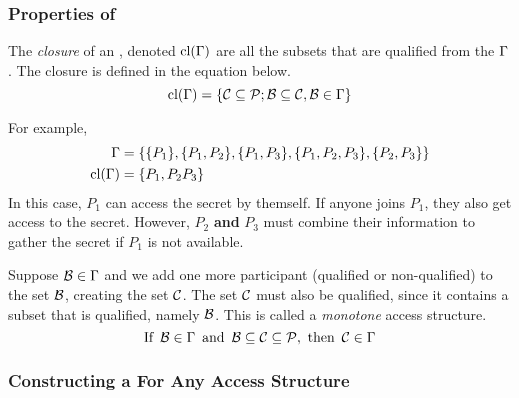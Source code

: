 \subsubsection{Properties of }\label{subsubsec:Properties_Access_Structures}
\begin{definition}[Closure]\label{def:Closure_Access_Structure}
  The \emph{closure} of an , denoted $\operatorname{\text{cl}}(\operatorname{\Gamma})$ are all the subsets that are qualified from the  $\operatorname{\Gamma}$.
  The closure is defined in the equation below.
  \begin{equation}\label{eq:Closure_Access_Structure}
    \operatorname{\text{cl}}(\operatorname{\Gamma}) = \lbrace \operatorname{\mathcal{C}} \subseteq \operatorname{\mathcal{P}}; \operatorname{\mathcal{B}} \subseteq \operatorname{\mathcal{C}}, \operatorname{\mathcal{B}} \in \operatorname{\Gamma} \rbrace
  \end{equation}

  For example,
  \begin{align*}
    \operatorname{\Gamma} &= \lbrace \lbrace P_{1} \rbrace, \lbrace P_{1}, P_{2} \rbrace, \lbrace P_{1}, P_{3} \rbrace, \lbrace P_{1}, P_{2}, P_{3} \rbrace, \lbrace P_{2}, P_{3} \rbrace \rbrace \\
    \operatorname{\text{cl}}(\operatorname{\Gamma}) &= \lbrace P_{1}, P_{2}P_{3} \rbrace
  \end{align*}
  In this case, $P_{1}$ can access the secret by themself.
  If anyone joins $P_{1}$, they also get access to the secret.
  However, $P_{2}$ \textbf{and} $P_{3}$ must combine their information to gather the secret if $P_{1}$ is not available.
\end{definition}

\begin{definition}[Monotone]\label{def:Monotone_Access_Structure}
  Suppose $\operatorname{\mathcal{B}} \in \operatorname{\Gamma}$ and we add one more participant (qualified or non-qualified) to the set $\operatorname{\mathcal{B}}$, creating the set $\operatorname{\mathcal{C}}$.
  The set $\operatorname{\mathcal{C}}$ must also be qualified, since it contains a subset that is qualified, namely $\operatorname{\mathcal{B}}$.
  This  is called a \emph{monotone} access structure.
  \begin{equation}\label{eq:Monotone_Access_Structure}
    \text{If } \operatorname{\mathcal{B}} \in \operatorname{\Gamma} \text{ and } \operatorname{\mathcal{B}} \subseteq \operatorname{\mathcal{C}} \subseteq \operatorname{\mathcal{P}}, \text{ then } \operatorname{\mathcal{C}} \in \operatorname{\Gamma}
  \end{equation}

\end{definition}

\subsubsection{Constructing a  For Any Access Structure}\label{subsubsec:Construct_Perfect_Secret_Sharing_Scheme}
